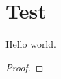 %

\section{Test}

\begin{lemma}
    \label{lem:test}
    \leanok
\end{lemma}

\begin{lemma}
    \label{lem:hello_world}
    Hello world.
\end{lemma}

\begin{proof}
\end{proof}